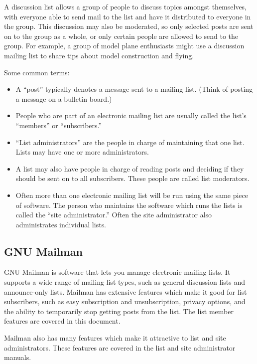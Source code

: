 \documentclass{howto}
\begin{document}
A discussion list allows a group of people to discuss topics amongst
themselves, with everyone able to send mail to the list and have it distributed
to everyone in the group.  This discussion may also be moderated, so only
selected posts are sent on to the group as a whole, or only certain people are
allowed to send to the group.  For example, a group of model plane enthusiasts
might use a discussion mailing list to share tips about model construction and
flying.

Some common terms:
\begin{itemize}
	\item A ``post'' typically denotes a message sent to a mailing list.  
	(Think of posting a message on a bulletin board.)
	\item People who are part of an electronic mailing list are usually called 
	the list's ``members'' or ``subscribers.''
	\item  ``List administrators'' are the people in charge of maintaining that 
	one list.  Lists may have one or more administrators.
	\item A list may also have people in charge of reading posts and deciding
	if they should be sent on to all subscribers.  These people are called
	list moderators.
	\item Often more than one electronic mailing list will be run using the same
	piece of software.  The person who maintains the software which runs
	the lists is called the ``site administrator.''  Often the site administrator
	also administrates individual lists.
\end{itemize}
\subsection{GNU Mailman}

GNU Mailman is software that lets you manage electronic mailing lists. It
supports a wide range of mailing list types, such as general discussion
lists and announce-only lists.  Mailman has extensive features which make it
good for list subscribers, such as easy subscription and unsubscription, 
privacy options, and the ability to temporarily stop getting posts from the 
list.  The list member features are covered in this document.

Mailman also has many features which make it attractive to list and site 
administrators.  These features are covered in the list and site administrator
manuals.
\end{document}
